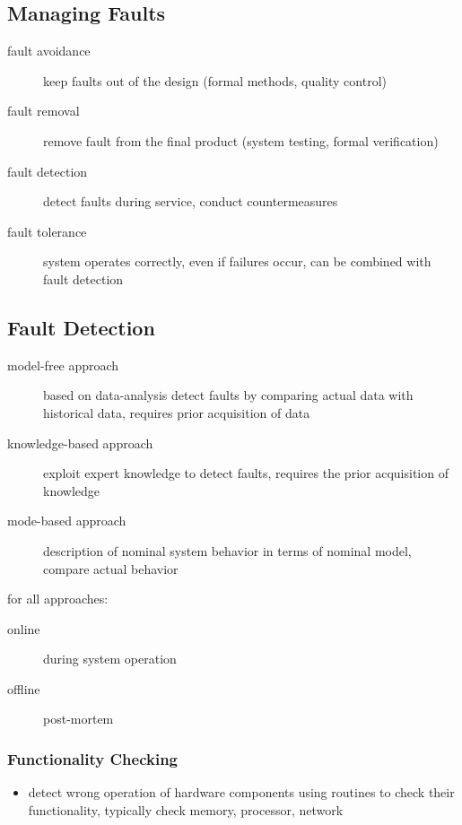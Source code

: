 \documentclass[a4paper, 10pt]{article}
\begin{document}
\subsection*{Managing Faults}
\begin{description}
    \item[fault avoidance] keep faults out of the design (formal methods, quality control)
    \item[fault removal] remove fault from the final product (system testing, formal verification)
    \item[fault detection] detect faults during service, conduct countermeasures
    \item[fault tolerance] system operates correctly, even if failures occur, can be combined with fault detection
\end{description}

\subsection*{Fault Detection}
\begin{description}
    \item[model-free approach] based on data-analysis \follows detect faults by comparing actual data with historical data, requires prior acquisition of data
    \item[knowledge-based approach] exploit expert knowledge to detect faults, requires the prior acquisition of knowledge
    \item[mode-based approach] description of nominal system behavior in terms of nominal model, compare actual behavior
\end{description}

for all approaches:
\begin{description}
    \item[online] during system operation
    \item[offline] post-mortem
\end{description}

\subsubsection*{Functionality Checking}
\begin{itemize}
    \item detect wrong operation of hardware components using routines to check their functionality, typically check memory, processor, network
\end{itemize}
\end{document}
